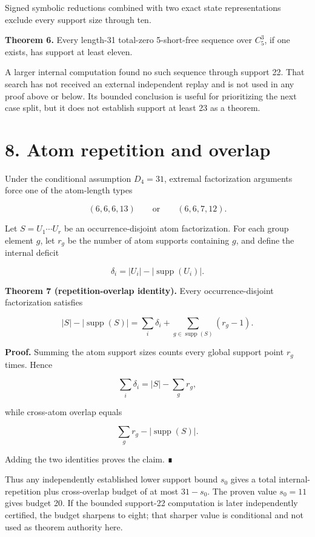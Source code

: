 \documentclass[
  11pt,
]{article}
\begin{document}
Signed symbolic reductions combined with two exact state representations
exclude every support size through ten.

\textbf{Theorem 6.} Every length-31 total-zero 5-short-free sequence
over \(C_5^3\), if one exists, has support at least eleven.

A larger internal computation found no such sequence through support 22.
That search has not received an external independent replay and is not
used in any proof above or below. Its bounded conclusion is useful for
prioritizing the next case split, but it does not establish support at
least 23 as a theorem.

\hypertarget{atom-repetition-and-overlap}{%
\section{8. Atom repetition and
overlap}\label{atom-repetition-and-overlap}}

Under the conditional assumption \(D_4=31\), extremal factorization
arguments force one of the atom-length types

\[
(6,6,6,13)
\qquad\text{or}\qquad
(6,6,7,12).
\]

Let \(S=U_1\cdots U_r\) be an occurrence-disjoint atom factorization.
For each group element \(g\), let \(r_g\) be the number of atom supports
containing \(g\), and define the internal deficit

\[
\delta_i=|U_i|-|\operatorname{supp}(U_i)|.
\]

\textbf{Theorem 7 (repetition-overlap identity).} Every
occurrence-disjoint factorization satisfies

\[
|S|-|\operatorname{supp}(S)|
=\sum_i\delta_i
+\sum_{g\in\operatorname{supp}(S)}(r_g-1).
\]

\textbf{Proof.} Summing the atom support sizes counts every global
support point \(r_g\) times. Hence

\[
\sum_i\delta_i=|S|-\sum_g r_g,
\]

while cross-atom overlap equals

\[
\sum_g r_g-|\operatorname{supp}(S)|.
\]

Adding the two identities proves the claim. ∎

Thus any independently established lower support bound \(s_0\) gives a
total internal-repetition plus cross-overlap budget of at most
\(31-s_0\). The proven value \(s_0=11\) gives budget 20. If the bounded
support-22 computation is later independently certified, the budget
sharpens to eight; that sharper value is conditional and not used as
theorem authority here.
\end{document}
